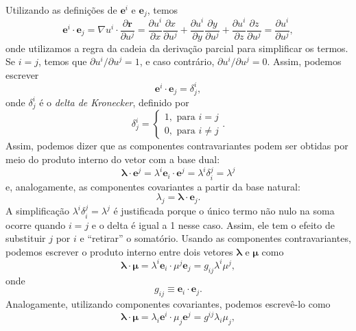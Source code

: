 Utilizando as definições de $\mathbf{e}^i$ e $\mathbf{e}_j$, temos
\[
	\mathbf{e}^{i} \cdot \mathbf{e}_{j}=\nabla u^{i} \cdot \frac{\partial \mathbf{r}}{\partial u^{j}}=\frac{\partial u^{i}}{\partial x} \frac{\partial x}{\partial u^{j}}+\frac{\partial u^{i}}{\partial y} \frac{\partial y}{\partial u^{j}}+\frac{\partial u^{i}}{\partial z} \frac{\partial z}{\partial u^{j}}=\frac{\partial u^{i}}{\partial u^{j}} ,
\]
onde utilizamos a regra da cadeia da derivação parcial para simplificar os termos. Se $i=j$, temos que $\partial u^{i} / \partial u^{j}=1$, e caso contrário, $\partial u^{i} / \partial u^{j}=0$. Assim, podemos escrever
\begin{equation}\label{eq:ProdutoInternoBase}
	\mathbf{e}^{i} \cdot \mathbf{e}_{j}=\delta_{j}^{i} ,
\end{equation}
onde $\delta^i_j$ é o \textit{delta de Kronecker}, definido por 
\begin{equation}\label{eq:DeltaKroneckerDefinicao}
\delta_{j}^{i}=\left\{\begin{array}{l}{1, \text { para } i=j} \\ {0, \text { para } i \neq j}\end{array}\right. .
\end{equation}
Assim, podemos dizer que as componentes contravariantes podem ser obtidas por meio do produto interno do vetor com a base dual:
\[
	\boldsymbol{\lambda} \cdot \mathbf{e}^{j}=\lambda^{i} \mathbf{e}_{i} \cdot \mathbf{e}^{j}=\lambda^{i} \delta_{i}^{j}=\lambda^{j}
\]
e, analogamente, as componentes covariantes a partir da base natural:
\[\lambda_{j}=\boldsymbol{\lambda} \cdot \mathbf{e}_{j}.\]
A simplificação $\lambda^i\delta^j_i=\lambda^j$ é justificada porque o único termo não nulo na soma ocorre quando $i=j$ e o delta é igual a 1 nesse caso. Assim, ele tem o efeito de substituir $j$ por $i$ e ``retirar'' o somatório.
Usando as componentes contravariantes, podemos escrever o produto interno entre dois vetores $\boldsymbol{\lambda}$ e $\boldsymbol{\mu}$ como 
\begin{equation*}
	\boldsymbol{\lambda} \cdot \boldsymbol{\mu}=\lambda^{i} \mathbf{e}_{i} \cdot \mu^{j} \mathbf{e}_{j}=g_{i j} \lambda^{i} \mu^{j} ,
\end{equation*}
onde
\begin{equation}\label{eq:DefinicaoTensorMetricaContravariante}
	\boxed{
		g_{i j} \equiv \mathbf{e}_{i} \cdot \mathbf{e}_{j}  .
	}
\end{equation}
Analogamente, utilizando componentes covariantes, podemos escrevê-lo como
\begin{equation*}
	\boldsymbol{\lambda} \cdot \boldsymbol{\mu}=\lambda_{i} \mathbf{e}^{i} \cdot \mu_{j} \mathbf{e}^{j}=g^{i j} \lambda_{i} \mu_{j}, 
\end{equation*}
